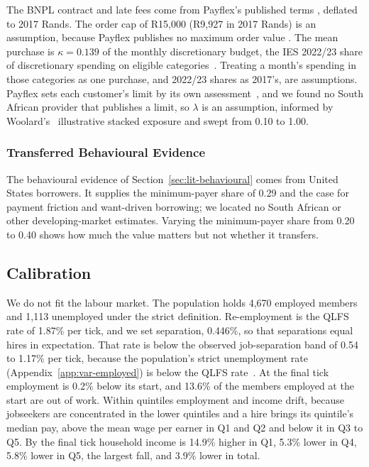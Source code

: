 The \ac{BNPL} contract and late fees come from Payflex's published terms
\citep{payflex_terms}, deflated to 2017 Rands. The order cap of R15{,}000
(R9{,}927 in 2017 Rands) is an assumption, because Payflex publishes no maximum order value
\citep{payflex_terms,payflex_limits}. The mean purchase is $\kappa = 0.139$ of the monthly
discretionary budget, the \ac{IES} 2022/23 share of discretionary spending on eligible
categories~\citep{statssa_ies_2023}. Treating a month's spending in those categories as one
purchase, and 2022/23 shares as 2017's, are assumptions.
Payflex sets each customer's limit by its own assessment~\citep{payflex_limits}, and we found no
South African provider that publishes a limit, so $\lambda$ is an assumption, informed
by Woolard's~\citeyearpar{woolard2021} illustrative stacked exposure and swept from 0.10 to 1.00.

\subsubsection*{Transferred Behavioural Evidence}
\label{sec:lim-transfer}
The behavioural evidence of Section~\ref{sec:lit-behavioural} comes from United States
borrowers. It supplies the minimum-payer share of 0.29 and the case for payment friction and
want-driven borrowing; we located no South African or other developing-market estimates.
Varying the minimum-payer share from 0.20 to 0.40 shows how much the value matters but not
whether it transfers.

\subsection{Calibration}
\label{sec:lim-calibration}

We do not fit the labour market. The population holds 4{,}670 employed members and 1{,}113
unemployed under the strict definition. Re-employment is the \ac{QLFS} rate of 1.87\% per tick,
and we set separation, 0.446\%, so that separations equal hires in expectation. That rate is
below the observed job-separation band of 0.54 to 1.17\% per tick, because the population's strict
unemployment rate (Appendix~\ref{app:var-employed}) is below the \ac{QLFS}
rate~\citep{statssa_lmd_2022}. At the final tick employment is 0.2\% below its start, and
13.6\% of the members employed at the start are out of work. Within quintiles employment and
income drift, because jobseekers are concentrated in the lower quintiles and a hire brings its
quintile's median pay, above the mean wage per earner in Q1 and Q2 and below it in Q3 to Q5. By
the final tick household income is 14.9\% higher in Q1,
5.3\% lower in Q4, 5.8\% lower in Q5, the largest fall, and 3.9\% lower in total.

